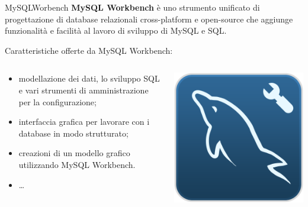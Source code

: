 \begin{frame}{MySQLWorbench}
\textbf{MySQL Workbench} \`e uno strumento unificato di progettazione di database relazionali cross-platform e open-source che aggiunge funzionalit\`a e facilit\`a al lavoro di sviluppo di MySQL e SQL.

Caratteristiche offerte da MySQL Workbench:
    \begin{columns}[T]%
        \begin{column}{0.7\textwidth}%
                \begin{itemize}[<+->]
                    \item modellazione dei dati, lo sviluppo SQL e vari strumenti di amministrazione per la configurazione;
                    \item interfaccia grafica per lavorare con i database in modo strutturato;
                    \item creazioni di un modello grafico utilizzando MySQL Workbench.
                    \item \ldots
                \end{itemize}
             \end{column}
        \begin{column}{0.3\textwidth}
            \includegraphics[width=.4\textwidth]{img/logo-mysql-workbench.png}
        \end{column}
    \end{columns}
\end{frame}